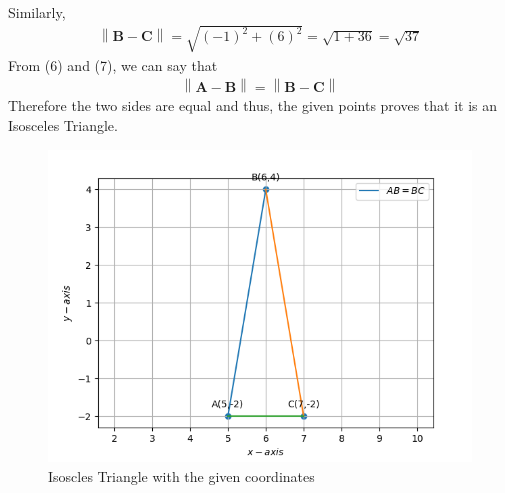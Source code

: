 \documentclass[12pt]{article}
\providecommand{\norm}[1]{\left\lVert#1\right\rVert}
\let\vec\mathbf
\begin{document}
\begin{enumerate}
\begin{align}
	\end{align}  
	Similarly,
	\begin{align}
		\norm{\vec{B}-\vec{C}} = \sqrt{(-1)^2+(6)^2} = \sqrt{1+36} = \sqrt{37}
\end{align}	  	
From (6) and (7), we can say that
	\begin{align}
		\norm{\vec{A}-\vec{B}} = \norm{\vec{B}-\vec{C}}
	\end{align}
Therefore the two sides are equal and thus, the given points proves that it is an Isosceles Triangle.
\begin{figure}[!h]
	\begin{center} 
	    \includegraphics[width=\columnwidth]{figs/Vector2.png}
	\end{center}
\caption{Isoscles Triangle with the given coordinates}
\label{fig:Fig}
\end{figure}
\end{enumerate}
\end{document}
